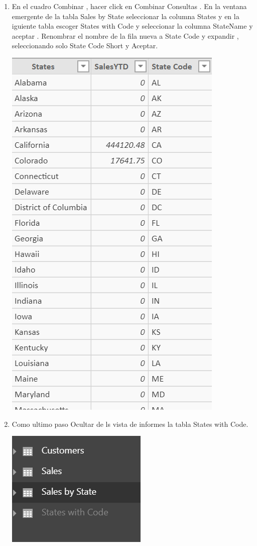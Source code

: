 \begin{itemize}
\begin{enumerate}
\item En el cuadro  Combinar , hacer click en Combinar Consultas . En la ventana emergente de la tabla Sales by State seleccionar la columna States y en la iguiente tabla escoger States with Code y seleccionar la columna StateName y aceptar . Renombrar el nombre de la fila  nueva a State Code y expandir , seleccionando solo State Code Short y Aceptar.

\begin{center}
\includegraphics[scale=1]{./Imagenes/tarea3_tablacombinada.png}
\end{center}

\item Como ultimo paso Ocultar de ls vista de informes la tabla States with Code.
\begin{center}
\includegraphics[scale=1]{./Imagenes/tarea3_ocultartabla.png}
\end{center}
\end{enumerate}



\end{itemize}
